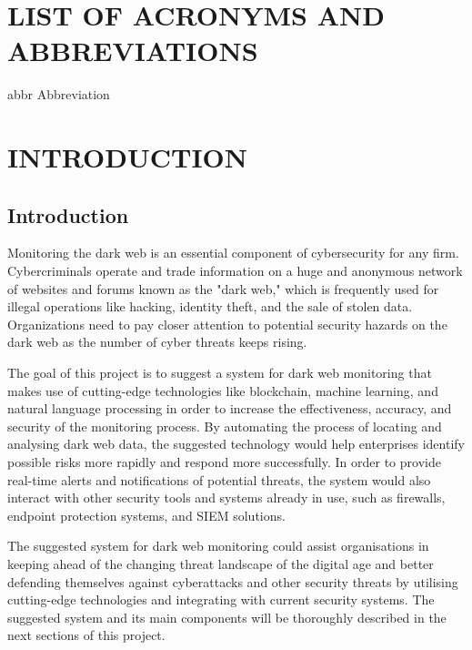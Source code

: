 \documentclass[10pt]{report}
\begin{document}
\chapter*{LIST OF ACRONYMS AND ABBREVIATIONS}
\begin{abbrv}
\item[abbr] Abbreviation
\end{abbrv}
\newpage
\renewcommand*\contentsname{TABLE OF CONTENTS}
\tableofcontents
{}
\thispagestyle{empty}
\chapter{INTRODUCTION}
\section{Introduction}
\hspace{0.5cm}
Monitoring the dark web is an essential component of cybersecurity for any firm. Cybercriminals operate and trade information on a huge and anonymous network of websites and forums known as the "dark web," which is frequently used for illegal operations like hacking, identity theft, and the sale of stolen data. Organizations need to pay closer attention to potential security hazards on the dark web as the number of cyber threats keeps rising.

The goal of this project is to suggest a system for dark web monitoring that makes use of cutting-edge technologies like blockchain, machine learning, and natural language processing in order to increase the effectiveness, accuracy, and security of the monitoring process. By automating the process of locating and analysing dark web data, the suggested technology would help enterprises identify possible risks more rapidly and respond more successfully. In order to provide real-time alerts and notifications of potential threats, the system would also interact with other security tools and systems already in use, such as firewalls, endpoint protection systems, and SIEM solutions.

The suggested system for dark web monitoring could assist organisations in keeping ahead of the changing threat landscape of the digital age and better defending themselves against cyberattacks and other security threats by utilising cutting-edge technologies and integrating with current security systems. The suggested system and its main components will be thoroughly described in the next sections of this project.\\
\linespread{1.5}
\end{document}
